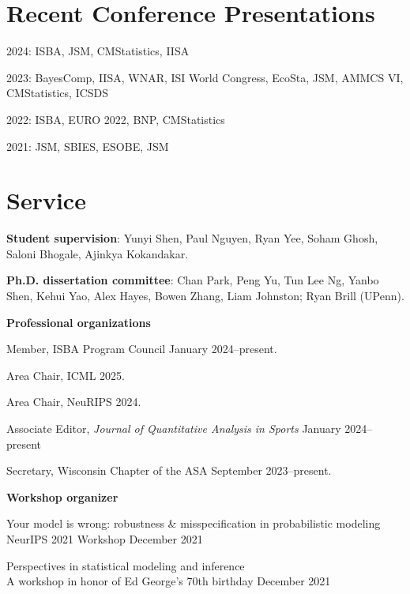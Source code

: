 \documentclass[10pt]{article}
\renewenvironment{itemize}{
  \begin{list}{}{
    \setlength{\leftmargin}{1.5em}
  }
}{
  \end{list}
}
\begin{document}
\section*{Recent Conference Presentations}

\begin{itemize}

\item{2024: ISBA, JSM, CMStatistics, IISA}
\item{2023: BayesComp, IISA, WNAR, ISI World Congress, EcoSta, JSM, AMMCS VI, CMStatistics, ICSDS}
\item{2022: ISBA, EURO 2022, BNP, CMStatistics}
\item{2021: JSM, SBIES, ESOBE, JSM}

\end{itemize}

\section*{Service}

\textbf{Student supervision}: Yunyi Shen, Paul Nguyen, Ryan Yee, Soham Ghosh, Saloni Bhogale, Ajinkya Kokandakar.

\textbf{Ph.D. dissertation committee}: Chan Park, Peng Yu, Tun Lee Ng, Yanbo Shen, Kehui Yao, Alex Hayes, Bowen Zhang, Liam Johnston; Ryan Brill (UPenn).

\textbf{Professional organizations}

\begin{itemize}
\item{Member, ISBA Program Council \hfill January 2024--present.}
\item{Area Chair, ICML \hfill 2025.}
\item{Area Chair, NeuRIPS \hfill 2024.}
\item{Associate Editor, \textit{Journal of Quantitative Analysis in Sports} \hfill January 2024--present}
\item{Secretary, Wisconsin Chapter of the ASA \hfill September 2023--present.}

\end{itemize}

\textbf{Workshop organizer} 

\begin{itemize}
\item{Your model is wrong: robustness \& misspecification in probabilistic modeling \\
NeurIPS 2021 Workshop \hfill December 2021}
\item{Perspectives in statistical modeling and inference \\
A workshop in honor of Ed George's 70th birthday \hfill December 2021}
\end{itemize}
\end{document}
